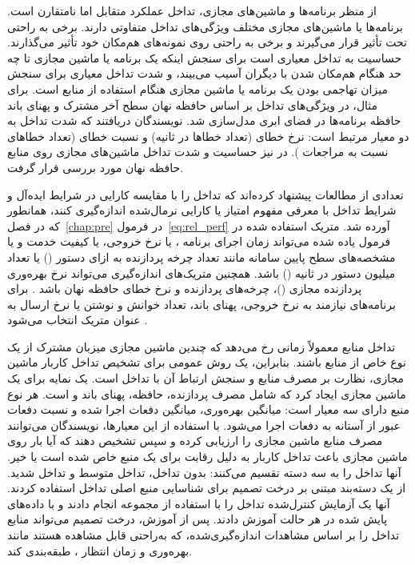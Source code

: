از منظر برنامه‌ها و ماشین‌های مجازی، تداخل عملکرد متقابل اما نامتقارن است. برنامه‌ها یا ماشین‌های مجازی مختلف ویژگی‌های تداخل متفاوتی دارند. برخی به ‌راحتی تحت تأثیر قرار می‌گیرند و برخی به ‌راحتی روی نمونه‌های هم‌مکان خود تأثیر می‌گذارند. حساسیت به تداخل معیاری است برای سنجش اینکه یک برنامه یا ماشین مجازی تا چه حد هنگام هم‌مکان شدن با دیگران آسیب می‌بیند، و شدت تداخل معیاری برای سنجش میزان تهاجمی بودن یک برنامه یا ماشین مجازی هنگام استفاده از منابع است. برای مثال، در \cite{kim2013vmconsolidation} ویژگی‌های تداخل بر اساس حافظه نهان سطح آخر  مشترک و پهنای باند حافظه برنامه‌ها در فضای ابری مدل‌سازی شد. نویسندگان دریافتند که شدت تداخل به دو معیار مرتبط است: نرخ خطای  (تعداد خطاها در ثانیه) و نسبت خطای  (تعداد خطاهای  نسبت به مراجعات ). در \cite{Chen2016Cache} نیز حساسیت و شدت تداخل ماشین‌های مجازی روی منابع حافظه نهان مورد بررسی قرار گرفت.

تعدادی از مطالعات پیشنهاد کرده‌اند که تداخل را با مقایسه کارایی در شرایط ایده‌آل و شرایط تداخل با معرفی مفهوم امتیاز یا کارایی نرمال‌شده اندازه‌گیری کنند\cite{novakovic2013deepdive, cheng2017precise}، همانطور که در فصل~\ref{chap:pre} در فرمول~\eqref{eq:rel_perf} آورده شد. متریک استفاده شده در فرمول یاده شده می‌تواند زمان اجرای برنامه \cite{novakovic2013deepdive, Zhao2016Interference, Chen2017Prophet, Javadi2016UIE}، یا نرخ خروجی\cite{Chiang2011TRACON}، یا کیفیت خدمت \cite{Yang2013BubbleFluxConf} و یا مشخصه‌های سطح پایین سامانه مانند تعداد چرخه پردازنده به ازای دستور () یا تعداد میلیون دستور در ثانیه () \cite{novakovic2013deepdive, cheng2017precise, Zhang2013CPI2} باشد. همچنین متریک‌های اندازه‌گیری می‌تواند نرخ بهره‌وری پردازنده مجازی ()، چرخه‌های پردازنده و نرخ خطای حافظه نهان باشد \cite{Sun2014MVEI}. برای برنامه‌های نیازمند به  نرخ خروجی، پهنای باند، تعداد خوانش و نوشتن یا نرخ ارسال به عنوان متریک انتخاب می‌شود \cite{Casale2011StorageIO}.

تداخل منابع معمولاً زمانی رخ می‌دهد که چندین ماشین مجازی میزبان مشترک از یک نوع خاص از منابع باشند. بنابراین، یک روش عمومی برای تشخیص تداخل کاربار ماشین مجازی، نظارت بر مصرف منابع و سنجش ارتباط آن با تداخل است. \cite{Peng2018VMProfiling} یک نمایه برای یک ماشین مجازی ایجاد کرد که شامل مصرف پردازنده،‌ حافظه، پهنای باند و  است. هر نوع منبع دارای سه معیار است: میانگین بهره‌وری، میانگین دفعات اجرا شده و نسبت دفعات عبور از آستانه به دفعات اجرا می‌شود. با استفاده از این معیارها، نویسندگان می‌توانند مصرف منابع ماشین مجازی را ارزیابی کرده و سپس تشخیص دهند که آیا بار روی ماشین مجازی باعث تداخل کاربار به دلیل رقابت برای یک منبع خاص شده است یا خیر. آنها تداخل را به سه دسته تقسیم می‌کنند: بدون تداخل، تداخل متوسط و تداخل شدید. \cite{Javadi2017DIAL} از یک دسته‌بند مبتنی بر درخت تصمیم برای شناسایی منبع اصلی تداخل استفاده کردند. آنها یک آزمایش کنترل‌شده تداخل را با استفاده از مجموعه  انجام دادند و با داده‌های پایش شده در هر حالت آموزش دادند. پس از آموزش، درخت تصمیم می‌تواند منابع تداخل را بر اساس مشاهدات اندازه‌گیری‌شده، که به‌راحتی قابل مشاهده هستند مانند بهره‌وری  و زمان انتظار ، طبقه‌بندی کند.

